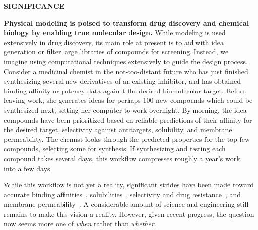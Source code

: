 \documentclass[11pt]{article}
\begin{document}
{%
\cite{Moult:2014:Proteins, Monastyrskyy:2016:Proteins, Moult:2016:Proteins, Prill:2011:Sci.Signal., Eisenstein:2013:NatBiotech, Saez-Rodriguez:2016:NatRevGenet, Bell:2010:CHANCE, ::XPRIZE, Kay:2011:R&DManage, XPrize:2017:Wikipedia, Mobley:2017:eScholarship, Gathiaka:2016:JComputAidedMolDes}
}





{\Large \bf SIGNIFICANCE}


\textbf{Physical modeling is poised to transform drug discovery and chemical biology by enabling true molecular design.}
While modeling is used extensively in drug discovery, its main role at present is to aid with idea generation or filter large libraries of compounds for screening. 
Instead, we imagine using computational techniques extensively to guide the design process. 
Consider a medicinal chemist in the not-too-distant future who has just finished synthesizing several new derivatives of an existing inhibitor, and has obtained binding affinity or potency data against the desired biomolecular target. 
Before leaving work, she generates ideas for perhaps 100 new compounds which could be synthesized next, setting her computer to work overnight. 
By morning, the idea compounds have been prioritized based on reliable predictions of their affinity for the desired target, selectivity against antitargets, solubility, and membrane permeability.  
The chemist looks through the predicted properties for the top few compounds, selecting some for synthesis. 
If synthesizing and testing each compound takes several days, this workflow compresses roughly a year's work into a few days.

While this workflow is not yet a reality, significant strides have been made toward accurate binding affinities~\cite{mobley_perspective_2012, christ_accuracy_2014, deng_distinguishing_2015, Sherborne:2016:JComputAidedMolDes, schrodinger_accurate_2015, christ_binding_2016, cui_affinity_2016, verras_free_2016, Aldeghi:2017:J.Am.Chem.Soc.}, solubilities~\cite{Schnieders:2012:J.Chem.TheoryComput., park_absolute_2014, liu_using_2016}, selectivity and drug resistance~\cite{leonis_contribution_2013, Aldeghi:2017:J.Am.Chem.Soc.}, and membrane permeability~\cite{lee_permeability_2016, comer_permeability_2014}. 
A considerable amount of science and engineering still remains to make this vision a reality.
However, given recent progress, the question now seems more one of \emph{when} rather than \emph{whether}.
\end{document}
